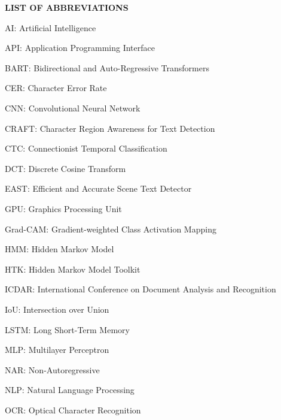\begin{center}
    {\englishfont\fontsize{14pt}{21pt}\selectfont \textbf{LIST OF ABBREVIATIONS} \par}
\end{center}
\label{loa}

\begin{adjustwidth}{0.2cm}{0.2cm}

    \vspace{1cm}
    \setlength{\parindent}{0pt}
    \vspace{0.3cm}
    {\large AI: Artificial Intelligence\dotfill\par}
    {\large API: Application Programming Interface\dotfill\par}
    {\large BART: Bidirectional and Auto-Regressive Transformers\dotfill\par}
    {\large CER: Character Error Rate\dotfill\par}
    {\large CNN: Convolutional Neural Network\dotfill\par}
    {\large CRAFT: Character Region Awareness for Text Detection\dotfill\par}
    {\large CTC: Connectionist Temporal Classification\dotfill\par}
    {\large DCT: Discrete Cosine Transform\dotfill\par}
    {\large EAST: Efficient and Accurate Scene Text Detector\dotfill\par}
    {\large GPU: Graphics Processing Unit\dotfill\par}
    {\large Grad-CAM: Gradient-weighted Class Activation Mapping\dotfill\par}
    {\large HMM: Hidden Markov Model\dotfill\par}
    {\large HTK: Hidden Markov Model Toolkit\dotfill\par}
    {\large ICDAR: International Conference on Document Analysis and Recognition\dotfill\par}
    {\large IoU: Intersection over Union\dotfill\par}
    {\large LSTM: Long Short-Term Memory\dotfill\par}
    {\large MLP: Multilayer Perceptron\dotfill\par}
    {\large NAR: Non-Autoregressive\dotfill\par}
    {\large NLP: Natural Language Processing\dotfill\par}
    {\large OCR: Optical Character Recognition\dotfill\par}

\end{adjustwidth}
